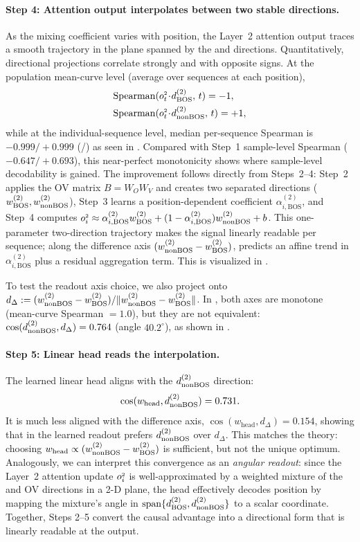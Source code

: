 \documentclass{article}
\theoremstyle{plain}
\theoremstyle{definition}
\theoremstyle{remark}
\begin{document}
\paragraph{Step 4: Attention output interpolates between two stable directions.}
As the \bos mixing coefficient varies with position, the Layer~2 attention output traces a smooth trajectory in the plane spanned by the \bos and \nbos directions.
Quantitatively, directional projections correlate strongly and with opposite signs.
At the population mean-curve level (average over sequences at each position),
\begin{align*}
&\mathrm{Spearman}(o_{t}^{\scriptscriptstyle 2}\!\cdot\! d_{\text{BOS}}^{(2)},\, t)=-1,\\
&\mathrm{Spearman}(o_{t}^{\scriptscriptstyle 2}\!\cdot\! d_{\text{nonBOS}}^{(2)},\, t)=+1,
\end{align*}
while at the individual-sequence level, median per-sequence Spearman is
$-0.999/+0.999$ (\bos/\nbos) as seen in .
Compared with Step~1 sample-level Spearman ($-0.647/+0.693$),
this near-perfect monotonicity shows where sample-level decodability is gained.
The improvement follows directly from Steps~2--4: Step~2 applies the OV matrix $B=W_O W_V$ and creates two separated directions
($w_{\text{BOS}}^{(2)},w_{\text{nonBOS}}^{(2)}$), Step~3 learns a position-dependent \bos coefficient $\alpha^{(2)}_{i,\mathrm{BOS}}$, and Step~4 computes
\(o_{i}^{\scriptscriptstyle 2} \approx \alpha^{(2)}_{i,\mathrm{BOS}} w_{\text{BOS}}^{(2)} + (1-\alpha^{(2)}_{i,\mathrm{BOS}}) w_{\text{nonBOS}}^{(2)} + b\).
This one-parameter two-direction trajectory makes the signal linearly readable per sequence; along the difference axis $(w_{\text{nonBOS}}^{(2)}-w_{\text{BOS}}^{(2)})$,  predicts an affine trend in $\alpha^{(2)}_{i,\mathrm{BOS}}$ plus a residual \nbos aggregation term.
This is visualized in .

To test the readout axis choice, we also project onto
$d_{\Delta}:=(w_{\text{nonBOS}}^{(2)}-w_{\text{BOS}}^{(2)})/\|w_{\text{nonBOS}}^{(2)}-w_{\text{BOS}}^{(2)}\|$.
In \modelminimal, both axes are monotone (mean-curve Spearman $=1.0$), but they are not equivalent:
$\cos(d_{\text{nonBOS}}^{(2)},d_{\Delta})=0.764$ (angle $40.2^\circ$), as shown in
.

\paragraph{Step 5: Linear head reads the interpolation.}
The learned linear head aligns with the $d_{\text{nonBOS}}^{(2)}$ direction:
\[
\cos(w_{\text{head}}, d_{\text{nonBOS}}^{(2)})=0.731.
\]
It is much less aligned with the difference axis,
$\cos(w_{\text{head}}, d_{\Delta})=0.154$,
showing that in \modelminimal the learned readout prefers $d_{\text{nonBOS}}^{(2)}$ over $d_{\Delta}$.
This matches the theory: choosing $w_{\text{head}}\propto (w_{\text{nonBOS}}^{(2)}-w_{\text{BOS}}^{(2)})$ is sufficient, but not the unique optimum.
Analogously, we can interpret this convergence as an \emph{angular readout}: since the Layer~2 attention update $o_{i}^{\scriptscriptstyle 2}$ is well-approximated by a weighted mixture of the \bos and \nbos OV directions in a 2-D plane, the head effectively decodes position by mapping the mixture's angle in $\mathrm{span}\{d_{\text{BOS}}^{(2)}, d_{\text{nonBOS}}^{(2)}\}$ to a scalar coordinate. Together, Steps 2--5 convert the causal \bos advantage into a directional form that is linearly readable at the output.
\end{document}

